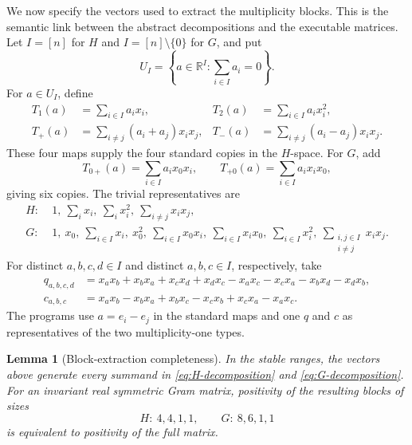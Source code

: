 \documentclass[11pt]{article}
\newtheorem{lemma}[theorem]{Lemma}
\begin{document}
We now specify the vectors used to extract the multiplicity blocks.  This is
the semantic link between the abstract decompositions and the executable
matrices.  Let \(I=[n]\) for \(H\) and \(I=[n]\setminus\{0\}\) for \(G\),
and put
\[
 U_I=\left\{a\in\mathbb R^I:\sum_{i\in I}a_i=0\right\}.
\]
For \(a\in U_I\), define
\begin{align*}
 T_1(a)&=\sum_{i\in I}a_ix_i,
 &T_2(a)&=\sum_{i\in I}a_ix_i^2,\\
 T_+(a)&=\sum_{i\ne j}(a_i+a_j)x_ix_j,
 &T_-(a)&=\sum_{i\ne j}(a_i-a_j)x_ix_j.
\end{align*}
These four maps supply the four standard copies in the \(H\)-space.  For
\(G\), add
\[
 T_{0+}(a)=\sum_{i\in I}a_ix_0x_i,\qquad
 T_{+0}(a)=\sum_{i\in I}a_ix_ix_0,
\]
giving six copies.  The trivial representatives are
\[
\begin{split}
 H:\;&1,\ \sum_i x_i,\ \sum_i x_i^2,\ \sum_{i\ne j}x_ix_j,\\
 G:\;&1,\ x_0,\ \sum_{i\in I}x_i,\ x_0^2,\
       \sum_{i\in I}x_0x_i,\ \sum_{i\in I}x_ix_0,\
       \sum_{i\in I}x_i^2,\ \sum_{\substack{i,j\in I\\i\ne j}}x_ix_j.
\end{split}
\]
For distinct \(a,b,c,d\in I\) and distinct \(a,b,c\in I\), respectively,
take
\begin{align*}
 q_{a,b,c,d}
 &=x_ax_b+x_bx_a+x_cx_d+x_dx_c
   -x_ax_c-x_cx_a-x_bx_d-x_dx_b,\\
 c_{a,b,c}
 &=x_ax_b-x_bx_a+x_bx_c-x_cx_b+x_cx_a-x_ax_c.
\end{align*}
The programs use \(a=e_i-e_j\) in the standard maps and one \(q\) and \(c\)
as representatives of the two multiplicity-one types.

\begin{lemma}[Block-extraction completeness]\label{lem:block-completeness}
In the stable ranges, the vectors above generate every summand in
\eqref{eq:H-decomposition} and \eqref{eq:G-decomposition}.  For an invariant
real symmetric Gram matrix, positivity of the resulting blocks of sizes
\[
 H:\ 4,4,1,1,\qquad G:\ 8,6,1,1
\]
is equivalent to positivity of the full matrix.
\end{lemma}
\end{document}
